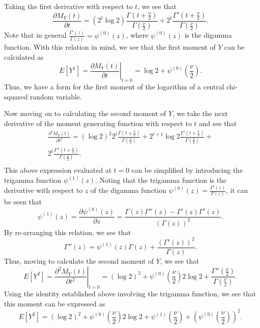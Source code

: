 \documentclass[12pt]{article} %
\theoremstyle{definition}
\begin{document}
Taking the first derivative with respect to $t$, we see that
\begin{equation*}
	\frac{\partial M_Y(t)}{\partial t} = (2^t \log 2) \frac{\Gamma (t + \frac{\nu}{2})}{\Gamma (\frac{\nu}{2})} + 2^t \frac{\Gamma ' (t + \frac{\nu}{2})}{\Gamma (\frac{\nu}{2})} .
\end{equation*}
Note that in general $\frac{\Gamma ' (z)}{\Gamma (z)} = \psi^{(0)}(z)$, where $\psi^{(0)}(z)$ is the digamma function. With this relation in mind, we see that the first moment of
$Y$ can be calculated as
\begin{equation*}
	E \left[ Y^1 \right] =  \left. \frac{\partial M_Y(t)}{\partial t} \right|_{t=0} = \log 2 + \psi^{(0)} \left( \frac{\nu}{2} \right) .
\end{equation*}
Thus, we have a form for the first moment of the logarithm of a central chi-squared random variable.

Now moving on to calculating the second moment of $Y$, we take the next derivative of the moment generating function with respect to $t$ and see that
\begin{equation*}
	\begin{split}
		\frac{\partial^2 M_Y(t)}{\partial t^2} = (\log 2)^2 2^t  \frac{\Gamma (t + \frac{\nu}{2})}{\Gamma (\frac{\nu}{2})} + 2^{t+1} \log 2 \frac{\Gamma ' (t + \frac{\nu}{2})}{\Gamma (\frac{\nu}{2})} + \\ 
		2^t \frac{\Gamma '' (t + \frac{\nu}{2})}{\Gamma (\frac{\nu}{2})} .\\
	\end{split}
\end{equation*}
This above expression evaluated at $t = 0$ can be simplified by introducing the trigamma function $ \psi^{(1)}(z)$. Noting that the trigamma function is the derivative with respect
to $z$ of the digamma function $\psi^{(0)}(z) = \frac{\Gamma ' (z)}{\Gamma (z)}$, it can be seen that
\begin{equation*}
	\psi^{(1)}(z) = \frac{\partial \psi^{(0)}(z)}{\partial z} = \frac{\Gamma (z) \Gamma '' (z) - \Gamma '(z) \Gamma '(z)}{(\Gamma(z))^2} .
\end{equation*}
By re-arranging this relation, we see that
\begin{equation*}
	\Gamma ''(z) = \psi^{(1)}(z) \Gamma(z) + \frac{(\Gamma '(z))^2}{\Gamma(z)} .
\end{equation*}
Thus, moving to calculate the second moment of $Y$, we see that
\begin{equation*}
	E \left[ Y^2 \right] =  \left. \frac{\partial^2 M_Y(t)}{\partial t^2} \right|_{t=0} =
	(\log 2)^2 + \psi^{(0)} \left( \frac{\nu}{2} \right) 2 \log 2  + \frac{\Gamma '' (\frac{\nu}{2})}{\Gamma (\frac{\nu}{2})} .
\end{equation*}
Using the identity established above involving the trigamma function, we see that this moment can be expressed as
\begin{equation*}
	E \left[ Y^2 \right] =
	(\log 2)^2 + \psi^{(0)} \left( \frac{\nu}{2} \right) 2 \log 2  + \psi^{(1)} \left( \frac{\nu}{2} \right) + \left( \psi^{(0)} \left( \frac{\nu}{2} \right) \right)^2 .
\end{equation*}
\end{document}
